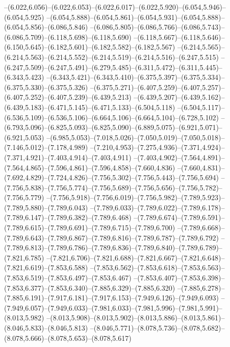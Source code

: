   --(6.022,6.056)--(6.022,6.053)--(6.022,6.017)--(6.022,5.920)--(6.054,5.946)--(6.054,5.925)%
  --(6.054,5.888)--(6.054,5.861)--(6.054,5.931)--(6.054,5.888)--(6.054,5.856)--(6.086,5.846)%
  --(6.086,5.805)--(6.086,5.766)--(6.086,5.743)--(6.086,5.709)--(6.118,5.698)--(6.118,5.690)%
  --(6.118,5.667)--(6.118,5.646)--(6.150,5.645)--(6.182,5.601)--(6.182,5.582)--(6.182,5.567)%
  --(6.214,5.565)--(6.214,5.563)--(6.214,5.552)--(6.214,5.519)--(6.214,5.516)--(6.247,5.515)%
  --(6.247,5.509)--(6.247,5.491)--(6.279,5.485)--(6.311,5.472)--(6.311,5.445)--(6.343,5.423)%
  --(6.343,5.421)--(6.343,5.410)--(6.375,5.397)--(6.375,5.334)--(6.375,5.330)--(6.375,5.326)%
  --(6.375,5.271)--(6.407,5.259)--(6.407,5.257)--(6.407,5.252)--(6.407,5.239)--(6.439,5.213)%
  --(6.439,5.207)--(6.439,5.162)--(6.439,5.183)--(6.471,5.145)--(6.471,5.133)--(6.504,5.118)%
  --(6.504,5.117)--(6.536,5.109)--(6.536,5.106)--(6.664,5.106)--(6.664,5.104)--(6.728,5.102)%
  --(6.793,5.096)--(6.825,5.093)--(6.825,5.090)--(6.889,5.075)--(6.921,5.071)--(6.921,5.053)%
  --(6.985,5.053)--(7.018,5.026)--(7.050,5.019)--(7.050,5.018)--(7.146,5.012)--(7.178,4.989)%
  --(7.210,4.953)--(7.275,4.936)--(7.371,4.924)--(7.371,4.921)--(7.403,4.914)--(7.403,4.911)%
  --(7.403,4.902)--(7.564,4.891)--(7.564,4.865)--(7.596,4.861)--(7.596,4.858)--(7.660,4.836)%
  --(7.660,4.831)--(7.692,4.829)--(7.724,4.826)--(7.756,5.302)--(7.756,5.443)--(7.756,5.694)%
  --(7.756,5.838)--(7.756,5.774)--(7.756,5.689)--(7.756,5.656)--(7.756,5.782)--(7.756,5.779)%
  --(7.756,5.918)--(7.756,6.019)--(7.756,5.982)--(7.789,5.923)--(7.789,5.880)--(7.789,6.043)%
  --(7.789,6.033)--(7.789,6.022)--(7.789,6.178)--(7.789,6.147)--(7.789,6.382)--(7.789,6.468)%
  --(7.789,6.674)--(7.789,6.591)--(7.789,6.615)--(7.789,6.691)--(7.789,6.715)--(7.789,6.700)%
  --(7.789,6.668)--(7.789,6.643)--(7.789,6.867)--(7.789,6.816)--(7.789,6.787)--(7.789,6.792)%
  --(7.789,6.813)--(7.789,6.786)--(7.789,6.836)--(7.789,6.840)--(7.789,6.789)--(7.821,6.785)%
  --(7.821,6.706)--(7.821,6.688)--(7.821,6.667)--(7.821,6.648)--(7.821,6.619)--(7.853,6.588)%
  --(7.853,6.562)--(7.853,6.618)--(7.853,6.563)--(7.853,6.519)--(7.853,6.497)--(7.853,6.467)%
  --(7.853,6.407)--(7.853,6.398)--(7.853,6.377)--(7.853,6.340)--(7.885,6.329)--(7.885,6.320)%
  --(7.885,6.278)--(7.885,6.191)--(7.917,6.181)--(7.917,6.153)--(7.949,6.126)--(7.949,6.093)%
  --(7.949,6.057)--(7.949,6.033)--(7.981,6.033)--(7.981,5.996)--(7.981,5.991)--(8.013,5.982)%
  --(8.013,5.908)--(8.013,5.902)--(8.013,5.886)--(8.013,5.861)--(8.046,5.833)--(8.046,5.813)%
  --(8.046,5.771)--(8.078,5.736)--(8.078,5.682)--(8.078,5.666)--(8.078,5.653)--(8.078,5.617)%
